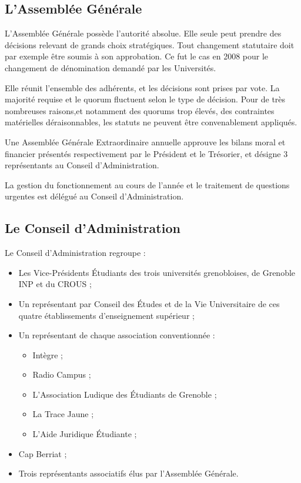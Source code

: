 \label{parcoursstruct}

\subsection{L'Assemblée Générale}

L'Assemblée Générale possède l'autorité absolue. Elle seule peut prendre des
décisions relevant de grands choix stratégiques. Tout changement statutaire
doit par exemple être soumis à son approbation. Ce fut le cas en 2008 pour le
changement de dénomination demandé par les Universités.

Elle réunit l'ensemble des adhérents,
et les décisions sont prises par vote.
La majorité requise et le quorum fluctuent selon le type de décision.
Pour de très nombreuses raisons,et notamment des quorums trop élevés,
des contraintes matérielles déraisonnables, les statuts ne peuvent être
convenablement appliqués.

Une Assemblée Générale Extraordinaire annuelle approuve les bilans moral et
financier présentés respectivement par le Président et le Trésorier,
et désigne 3 représentants au Conseil d'Administration.

La gestion du fonctionnement au cours de l'année et le traitement de questions
urgentes est délégué au Conseil d'Administration.

\subsection{Le Conseil d'Administration}
\label{ca}

Le Conseil d'Administration regroupe :

\begin{itemize}
\item Les Vice-Présidents Étudiants des trois universités grenobloises, de Grenoble INP et du CROUS ;
\item Un représentant par Conseil des Études et de la Vie Universitaire de ces quatre établissements d'enseignement supérieur ;
\item Un représentant de chaque association conventionnée :
	\begin{itemize}
	\item Intègre ;
	\item Radio Campus ;
	\item L'Association Ludique des Étudiants de Grenoble ;
	\item La Trace Jaune ;
	\item L'Aide Juridique Étudiante ;
	\end{itemize}
\item Cap Berriat ;
\item Trois représentants associatifs élus par l'Assemblée Générale.
\end{itemize}

